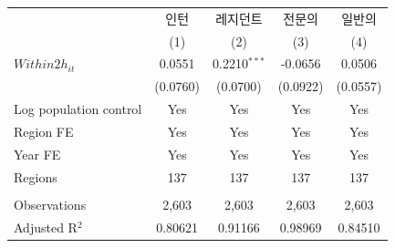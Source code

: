 \begingroup
\centering
\begin{tabular}{lcccc}
   \toprule
                          & 인턴     & 레지던트       & 전문의   & 일반의 \\   
                          & (1)      & (2)            & (3)      & (4)\\  
   \midrule 
   $Within2h_{it}$        & 0.0551   & 0.2210$^{***}$ & -0.0656  & 0.0506\\   
                          & (0.0760) & (0.0700)       & (0.0922) & (0.0557)\\   
   Log population control & Yes      & Yes            & Yes      & Yes\\  
   Region FE              & Yes      & Yes            & Yes      & Yes\\  
   Year FE                & Yes      & Yes            & Yes      & Yes\\  
   Regions                & 137      & 137            & 137      & 137\\  
    \\
   Observations           & 2,603    & 2,603          & 2,603    & 2,603\\  
   Adjusted R$^2$         & 0.80621  & 0.91166        & 0.98969  & 0.84510\\  
   \bottomrule
\end{tabular}
\par\endgroup
